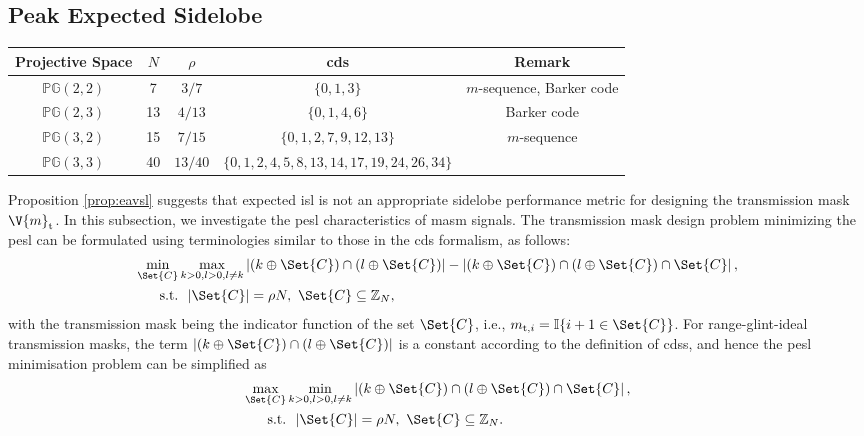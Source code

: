 \documentclass[journal,a4paper,10pt, romanappendices]{IEEEtran}
\begin{document}
\subsection{Peak Expected Sidelobe}
\begin{table*}[t]
\caption{Examples of ideal transmission masks associated with Singer \acp{cds}.}
    \label{tab:singer_examples}
    \centering
    \begin{tabular}{|c|c|c|c|c|} \hline
        Projective Space & $N$ & $\rho$ & \ac{cds} & Remark \\ \hline
        $\mathbb{PG}(2,2)$ & 7 & $3/7$ & $\{0,1,3\}$ & $m$-sequence, Barker code \\ \hline
        $\mathbb{PG}(2,3)$ & 13 & $4/13$ & $\{0,1,4,6\}$ & Barker code \\ \hline 
        $\mathbb{PG}(3,2)$ & 15 & $7/15$ & $\{0, 1, 2, 7, 9,12,13\}$ & $m$-sequence \\ \hline
        $\mathbb{PG}(3,3)$ & 40 & $13/40$ & $\{0, 1, 2, 4, 5, 8,13,14,17,19,24,26,34\}$ & \\\hline
    \end{tabular}
    \vspace{-5mm}
\end{table*}
Proposition \ref{prop:eavsl} suggests that expected \ac{isl} is not an appropriate sidelobe performance metric for designing the transmission mask $\V{m}_{\rm t}$. In this subsection, we investigate the \ac{pesl} characteristics of \ac{masm} signals. The transmission mask design problem minimizing the \ac{pesl} can be formulated using terminologies similar to those in the \ac{cds} formalism, as follows:
\begin{subequations}\label{pesl_min_ori}
\begin{align}
\min_{\Set{C}} & \max_{k>0,l>0,l\neq k} \left|(k\oplus\Set{C})\cap (l\oplus\Set{C})\right|-\left|(k\oplus\Set{C})\cap (l\oplus\Set{C})\cap \Set{C}\right|,\\
{\rm s.t.}&~~|\Set{C}|=\rho N,~\Set{C}\subseteq \mathbb{Z}_N,
\end{align} 
\end{subequations}
with the transmission mask being the indicator function of the set $\Set{C}$, i.e., $m_{{\rm t},i}=\mathbb{I}\{i+1\in \Set{C}\}$. For range-glint-ideal transmission masks, the term $\left|(k\oplus\Set{C})\cap (l\oplus\Set{C})\right|$ is a constant according to the definition of \acp{cds}, and hence the \ac{pesl} minimisation problem can be simplified as
\begin{subequations}\label{pesl_min_simple}
\begin{align}
\max_{\Set{C}} & \min_{k>0,l>0,l\neq k} \left|(k\oplus\Set{C})\cap (l\oplus\Set{C})\cap \Set{C}\right|,\\
{\rm s.t.}&~~|\Set{C}|=\rho N,~\Set{C}\subseteq \mathbb{Z}_N.
\end{align} 
\end{subequations}
\end{document}
